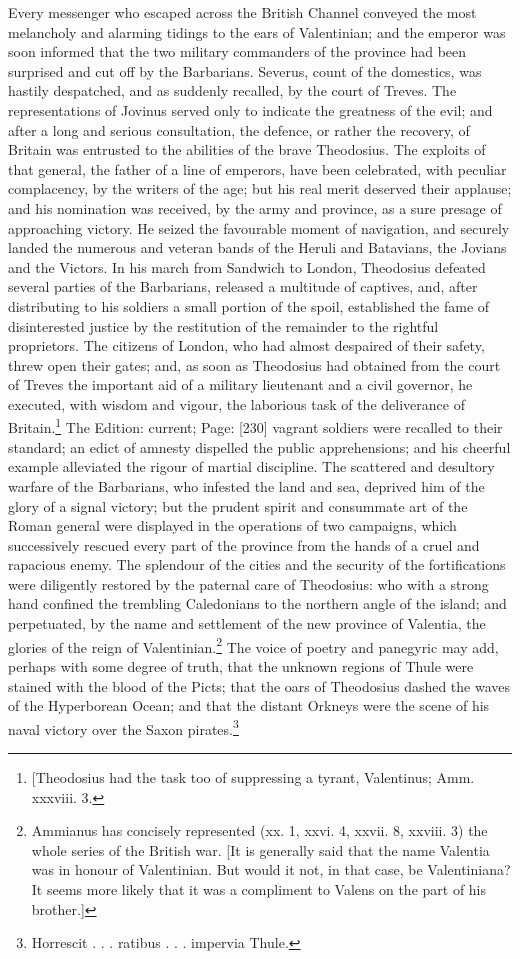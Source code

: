 Every messenger who escaped across the British Channel conveyed the most melancholy and alarming tidings to the ears of Valentinian; and the emperor was soon informed that the two military commanders of the province had been surprised and cut off by the Barbarians. Severus, count of the domestics, was hastily despatched, and as suddenly recalled, by the court of Treves. The representations of Jovinus served only to indicate the greatness of the evil; and after a long and serious consultation, the defence, or rather the recovery, of Britain was entrusted to the abilities of the brave Theodosius. The exploits of that general, the father of a line of emperors, have been celebrated, with peculiar complacency, by the writers of the age; but his real merit deserved their applause; and his nomination was received, by the army and province, as a sure presage of approaching victory. He seized the favourable moment of navigation, and securely landed the numerous and veteran bands of the Heruli and Batavians, the Jovians and the Victors. In his march from Sandwich to London, Theodosius defeated several parties of the Barbarians, released a multitude of captives, and, after distributing to his soldiers a small portion of the spoil, established the fame of disinterested justice by the restitution of the remainder to the rightful proprietors. The citizens of London, who had almost despaired of their safety, threw open their gates; and, as soon as Theodosius had obtained from the court of Treves the important aid of a military lieutenant and a civil governor, he executed, with wisdom and vigour, the laborious task of the deliverance of Britain.\footnote{[Theodosius had the task too of suppressing a tyrant, Valentinus; Amm. xxxviii. 3.} The Edition: current; Page: [230] vagrant soldiers were recalled to their standard; an edict of amnesty dispelled the public apprehensions; and his cheerful example alleviated the rigour of martial discipline. The scattered and desultory warfare of the Barbarians, who infested the land and sea, deprived him of the glory of a signal victory; but the prudent spirit and consummate art of the Roman general were displayed in the operations of two campaigns, which successively rescued every part of the province from the hands of a cruel and rapacious enemy. The splendour of the cities and the security of the fortifications were diligently restored by the paternal care of Theodosius: who with a strong hand confined the trembling Caledonians to the northern angle of the island; and perpetuated, by the name and settlement of the new province of Valentia, the glories of the reign of Valentinian.\footnote{Ammianus has concisely represented (xx. 1, xxvi. 4, xxvii. 8, xxviii. 3) the whole series of the British war. [It is generally said that the name Valentia was in honour of Valentinian. But would it not, in that case, be Valentiniana? It seems more likely that it was a compliment to Valens on the part of his brother.]} The voice of poetry and panegyric may add, perhaps with some degree of truth, that the unknown regions of Thule were stained with the blood of the Picts; that the oars of Theodosius dashed the waves of the Hyperborean Ocean; and that the distant Orkneys were the scene of his naval victory over the Saxon pirates.\footnote{Horrescit . . . ratibus . . . impervia Thule.

}
